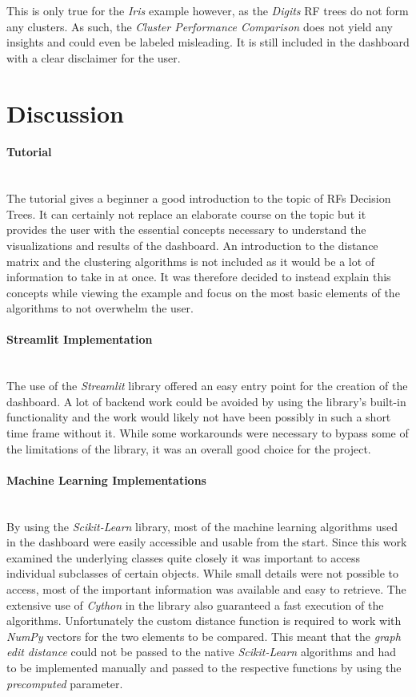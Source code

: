 \documentclass[a4paper, 12pt]{article}
\begin{document}
This is only true for the \textit{Iris} example however, as the \textit{Digits} RF trees do not form any
clusters. As such, the \textit{Cluster Performance Comparison} does not yield any insights and could even be
labeled misleading. It is still included in the dashboard with a clear disclaimer for the user.

\section{Discussion}
\paragraph{Tutorial}\mbox{}\\
The tutorial gives a beginner a good introduction to the topic of RFs Decision Trees. It can certainly not
replace an elaborate course on the topic but it provides the user with the essential concepts necessary to
understand the visualizations and results of the dashboard. An introduction to the distance matrix and the
clustering algorithms is not included as it would be a lot of information to take in at once. It was
therefore decided to instead explain this concepts while viewing the example and focus on the most basic
elements of the algorithms to not overwhelm the user. \par

\paragraph{Streamlit Implementation}\mbox{}\\
The use of the \textit{Streamlit} library offered an easy entry point for the creation of the dashboard.
A lot of backend work could be avoided by using the library's built-in functionality and the work would
likely not have been possibly in such a short time frame without it. While some workarounds were necessary
to bypass some of the limitations of the library, it was an overall good choice for the project. \par

\paragraph{Machine Learning Implementations}\mbox{}\\
By using the \textit{Scikit-Learn} library, most of the machine learning algorithms used in the dashboard
were easily accessible and usable from the start. Since this work examined the underlying classes quite
closely it was important to access individual subclasses of certain objects. While small details were not
possible to access, most of the important information was available and easy to retrieve. The extensive use
of \textit{Cython} in the library also guaranteed a fast execution of the algorithms. Unfortunately the
custom distance function is required to work with \textit{NumPy} vectors for the two elements to be compared.
This meant that the \textit{graph edit distance} could not be passed to the native \textit{Scikit-Learn}
algorithms and had to be implemented manually and passed to the respective functions by using the
\textit{precomputed} parameter. \par
\end{document}
